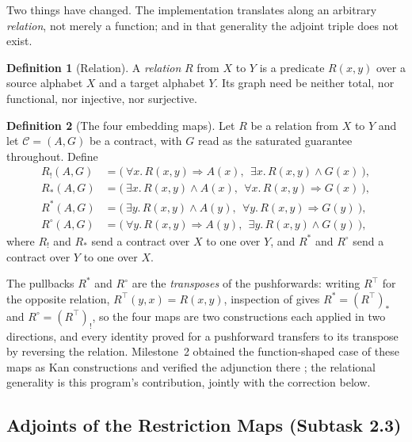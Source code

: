 \documentclass[11pt]{article}
\theoremstyle{definition}
\newtheorem{definition}{Definition}
\theoremstyle{remark}
\begin{document}
Two things have changed.
The implementation translates along an arbitrary \emph{relation}, not merely a function; and in
that generality the adjoint triple does not exist.

\begin{definition}[Relation]
A \emph{relation} $R$ from $X$ to $Y$ is a predicate $R(x, y)$ over a source alphabet $X$ and a
target alphabet $Y$.
Its graph need be neither total, nor functional, nor injective, nor surjective.
\end{definition}

\begin{definition}[The four embedding maps]
\label{def:embeddings}
Let $R$ be a relation from $X$ to $Y$ and let $\mathcal{C} = (A, G)$ be a contract, with
$G$ read as the saturated guarantee throughout.
Define
\begin{align}
\label{eq:lan}
R_!(A, G)      &= \bigl(\ \forall x.\, R(x,y) \Rightarrow A(x),\ \ \exists x.\, R(x,y) \wedge G(x)\ \bigr), \\
\label{eq:ran}
R_*(A, G)      &= \bigl(\ \exists x.\, R(x,y) \wedge A(x),\ \ \forall x.\, R(x,y) \Rightarrow G(x)\ \bigr), \\
\label{eq:pullback}
R^{*}(A, G)    &= \bigl(\ \exists y.\, R(x,y) \wedge A(y),\ \ \forall y.\, R(x,y) \Rightarrow G(y)\ \bigr), \\
\label{eq:dual-pullback}
R^{\circ}(A, G)&= \bigl(\ \forall y.\, R(x,y) \Rightarrow A(y),\ \ \exists y.\, R(x,y) \wedge G(y)\ \bigr),
\end{align}
where $R_!$ and $R_*$ send a contract over $X$ to one over $Y$, and $R^{*}$ and $R^{\circ}$
send a contract over $Y$ to one over $X$.
\end{definition}

The pullbacks $R^{*}$ and $R^{\circ}$ are the \emph{transposes} of the pushforwards: writing
$R^{\top}$ for the opposite relation, $R^{\top}(y, x) = R(x, y)$, inspection of
 gives $R^{*} = (R^{\top})_*$ and $R^{\circ} = (R^{\top})_!$, so the four
maps are two constructions each applied in two directions, and every identity proved for a
pushforward transfers to its transpose by reversing the relation.
Milestone~2 obtained the function-shaped case of these maps as Kan constructions and verified
the adjunction there \citep{riessSEAMANMS2}; the relational generality is this program's
contribution, jointly with the correction below.

\subsection{Adjoints of the Restriction Maps (Subtask 2.3)}
\label{sec:subtask23}
\end{document}
